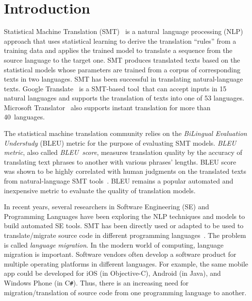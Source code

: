 \section{Introduction}
\label{sec:intro}

Statistical Machine Translation (SMT)~\cite{smtbook} is a
natural~language processing (NLP) approach that uses statistical
learning to derive the translation ``rules'' from a training data and
applies the trained model to translate a sequence from the source
language to the target one. SMT produces translated
texts based on the statistical models whose parameters are trained
from a corpus of corresponding texts in two languages. SMT has
been successful in translating natural-language texts.  Google
Translate~\cite{googletranslate} is a SMT-based tool~that can accept
inputs in 15 natural languages and supports the translation of texts
into one of 53 languages. Microsoft Translator~\cite{mstranslator}
also supports instant translation for more than 40~languages.

The statistical machine translation community relies on the {\em
  BiLingual Evaluation Understudy} (BLEU) metric for the purpose of
evaluating SMT models. {\em BLEU metric}, also called {\em
  BLEU~score}, measures translation quality by the accuracy of
translating text phrases to another with various phrases'
lengths. BLEU score was shown to be highly correlated with human judgments
on the translated texts from natural-language SMT
tools~\cite{Papineni2002}.
%
BLEU remains a popular automated and inexpensive
metric to evaluate the quality of translation models.



In recent years, several researchers in Software Engineering (SE) and
Programming Languages have been exploring the NLP techniques and
models to build automated SE tools. SMT has been directly used or
adapted to be used to translate/migrate source code in different
programming
languages~\cite{fse13-nier,icse14-demo,karaivanov14,ase15,icsme16}. The
problem is called {\em language migration}. In the modern world of
computing, language migration is important. Software vendors often
develop a software product for multiple operating platforms in
different languages. For example, the same mobile app could be
developed for iOS (in Objective-C), Android (in Java), and Windows
Phone (in C\texttt{\#}).
Thus, there is an increasing need for migration/translation
of source code from one programming language to another.
%

